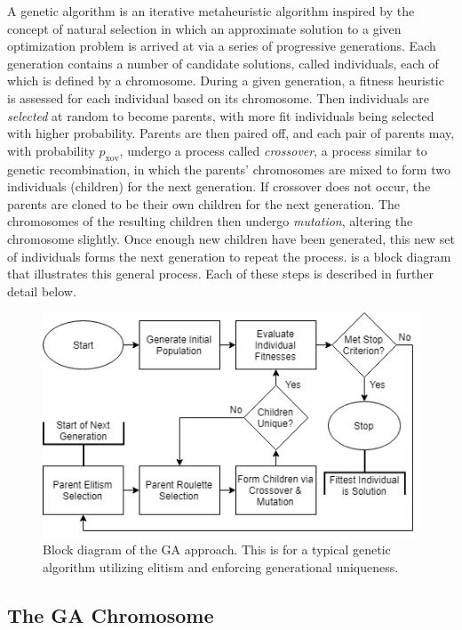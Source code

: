 \documentclass[12pt,dvipsnames]{report}
\begin{document}
A genetic algorithm is an iterative metaheuristic algorithm inspired by the concept of natural selection in which an approximate solution to a given optimization problem is arrived at via a series of progressive generations.  Each generation contains a number of candidate solutions, called individuals, each of which is defined by a chromosome.  During a given generation, a fitness heuristic is assessed for each individual based on its chromosome.  Then individuals are \emph{selected} at random to become parents, with more fit individuals being selected with higher probability.  Parents are then paired off, and each pair of parents may, with probability $p_\text{xov}$, undergo a process called \emph{crossover}, a process similar to genetic recombination, in which the parents' chromosomes are mixed to form two individuals (children) for the next generation.  If crossover does not occur, the parents are cloned to be their own children for the next generation.  The chromosomes of the resulting children then undergo \emph{mutation}, altering the chromosome slightly.  Once enough new children have been generated, this new set of individuals forms the next generation to repeat the process.   is a block diagram that illustrates this general process.  Each of these steps is described in further detail below.

\begin{figure}[!ht]
\centering
\includegraphics[width=1\linewidth]{Genetic_Algorithm_Basic}
\caption[Genetic Algorithm Block Diagram]{\small Block diagram of the GA approach.  This is for a typical genetic algorithm utilizing elitism and enforcing generational uniqueness.}
\label{fig:ga_block}
\end{figure}

\subsection{The GA Chromosome} \label{subsec:ga_chromosome}
\end{document}
